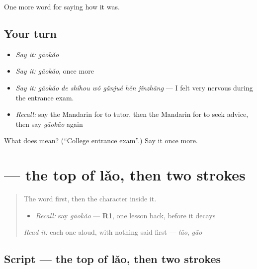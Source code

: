 \begin{grammarlens}[title={What you've built}]
One more word for saying how it was.
\end{grammarlens}

\subsection*{Your turn}
\begin{itemize}
\raggedright
  \item \emph{Say it:} \emph{gāokǎo}
  \item \emph{Say it:} \emph{gāokǎo}, once more
  \item \emph{Say it:} \emph{gāokǎo de shíhou wǒ gǎnjué hěn jǐnzhāng} — I felt very nervous during the entrance exam.
  \item \emph{Recall:} say the Mandarin for to tutor, then the Mandarin for to seek advice, then say \emph{gāokǎo} again
\end{itemize}

\begin{tcolorbox}[breakable,colback=teal!4,colframe=teal!35!black,title={Before you move on}]
What does  mean? (\textquotedblleft{}College entrance exam\textquotedblright{}.) Say it once more.
\end{tcolorbox}
\section[\texorpdfstring{\zh{考} (kǎo)}{考 (kǎo)}]{ — the top of lǎo, then two strokes}

\label{lesson:ZH-W494-kao-test}



\begin{quote}
The word first, then the character inside it.

\begin{itemize}
\raggedright
  \item \emph{Recall:} say \emph{gāokǎo} — \textbf{R1}, one lesson back, before it decays
\end{itemize}

\begin{quote}
 
\end{quote}

\emph{Read it:} each one aloud, with nothing said first — \emph{lǎo}, \emph{gāo}
\end{quote}

\subsection*{Script — the top of lǎo, then two strokes}

